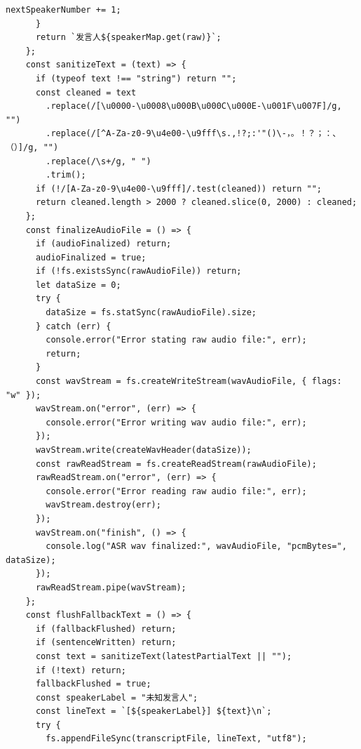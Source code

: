 \documentclass[12pt,a4paper]{article}
\begin{document}
\begin{Verbatim}[fontsize=\footnotesize]
        nextSpeakerNumber += 1;
      }
      return `发言人${speakerMap.get(raw)}`;
    };
    const sanitizeText = (text) => {
      if (typeof text !== "string") return "";
      const cleaned = text
        .replace(/[\u0000-\u0008\u000B\u000C\u000E-\u001F\u007F]/g, "")
        .replace(/[^A-Za-z0-9\u4e00-\u9fff\s.,!?;:'"()\-，。！？；：、（）]/g, "")
        .replace(/\s+/g, " ")
        .trim();
      if (!/[A-Za-z0-9\u4e00-\u9fff]/.test(cleaned)) return "";
      return cleaned.length > 2000 ? cleaned.slice(0, 2000) : cleaned;
    };
    const finalizeAudioFile = () => {
      if (audioFinalized) return;
      audioFinalized = true;
      if (!fs.existsSync(rawAudioFile)) return;
      let dataSize = 0;
      try {
        dataSize = fs.statSync(rawAudioFile).size;
      } catch (err) {
        console.error("Error stating raw audio file:", err);
        return;
      }
      const wavStream = fs.createWriteStream(wavAudioFile, { flags: "w" });
      wavStream.on("error", (err) => {
        console.error("Error writing wav audio file:", err);
      });
      wavStream.write(createWavHeader(dataSize));
      const rawReadStream = fs.createReadStream(rawAudioFile);
      rawReadStream.on("error", (err) => {
        console.error("Error reading raw audio file:", err);
        wavStream.destroy(err);
      });
      wavStream.on("finish", () => {
        console.log("ASR wav finalized:", wavAudioFile, "pcmBytes=", dataSize);
      });
      rawReadStream.pipe(wavStream);
    };
    const flushFallbackText = () => {
      if (fallbackFlushed) return;
      if (sentenceWritten) return;
      const text = sanitizeText(latestPartialText || "");
      if (!text) return;
      fallbackFlushed = true;
      const speakerLabel = "未知发言人";
      const lineText = `[${speakerLabel}] ${text}\n`;
      try {
        fs.appendFileSync(transcriptFile, lineText, "utf8");
\end{Verbatim}
\newpage
{}
\fancyhead[R]{}
\end{document}
